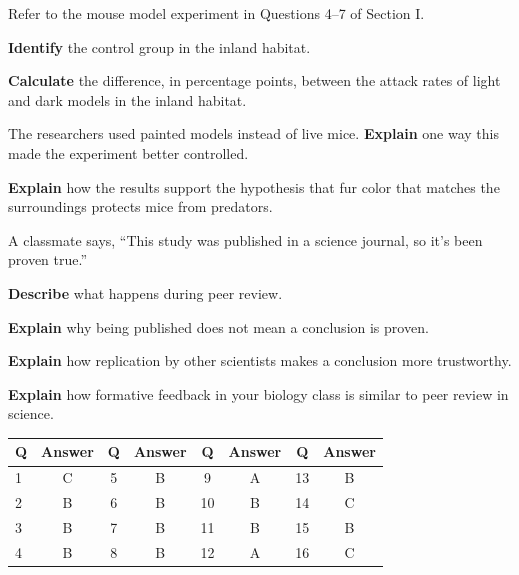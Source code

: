 \documentclass[11pt,letterpaper]{article}
\begin{document}

Refer to the mouse model experiment in Questions 4–7 of Section I.

\begin{parts}
  \item \textbf{Identify} the control group in the inland habitat.
  \item \textbf{Calculate} the difference, in percentage points, between the attack rates of light and dark models in the inland habitat.
  \item The researchers used painted models instead of live mice. \textbf{Explain} one way this made the experiment better controlled.
  \item \textbf{Explain} how the results support the hypothesis that fur color that matches the surroundings protects mice from predators.
\end{parts}


A classmate says, ``This study was published in a science journal, so it's been proven true.''

\begin{parts}
  \item \textbf{Describe} what happens during peer review.
  \item \textbf{Explain} why being published does not mean a conclusion is proven.
  \item \textbf{Explain} how replication by other scientists makes a conclusion more trustworthy.
  \item \textbf{Explain} how formative feedback in your biology class is similar to peer review in science.
\end{parts}

\answerkey


\begin{center}
\begin{tabular}{@{}lccccccc@{}}
\toprule
Q & Answer & Q & Answer & Q & Answer & Q & Answer \\
\midrule
1 & C & 5 & B & 9 & A & 13 & B \\
2 & B & 6 & B & 10 & B & 14 & C \\
3 & B & 7 & B & 11 & B & 15 & B \\
4 & B & 8 & B & 12 & A & 16 & C \\
\bottomrule
\end{tabular}
\end{center}
\end{document}
